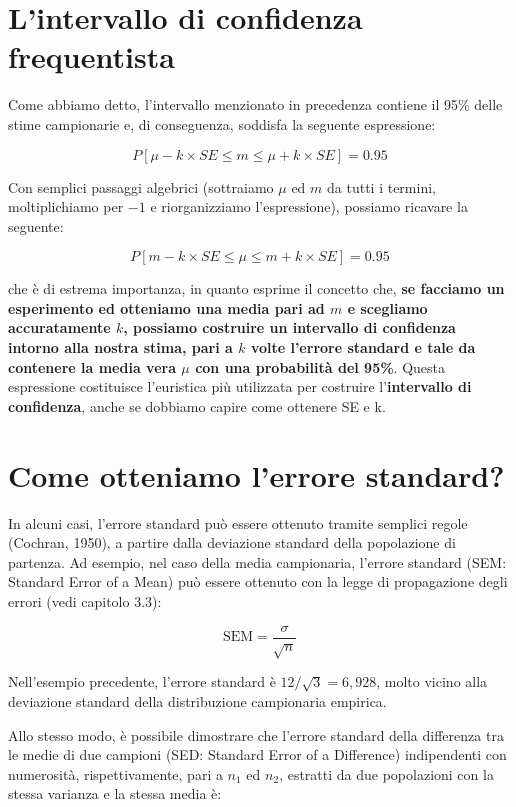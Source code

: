 \documentclass[
  12pt,
]{book}
\begin{document}
\hypertarget{lintervallo-di-confidenza-frequentista}{%
\section{L'intervallo di confidenza frequentista}\label{lintervallo-di-confidenza-frequentista}}

Come abbiamo detto, l'intervallo menzionato in precedenza contiene il 95\% delle stime campionarie e, di conseguenza, soddisfa la seguente espressione:

\[P \left[ \mu - k \times SE  \leq m \leq \mu + k \times SE \right] = 0.95\]

Con semplici passaggi algebrici (sottraiamo \(\mu\) ed \(m\) da tutti i termini, moltiplichiamo per \(-1\) e riorganizziamo l'espressione), possiamo ricavare la seguente:

\[P \left[ m - k \times SE \leq \mu \leq m + k \times SE \right] = 0.95\]

che è di estrema importanza, in quanto esprime il concetto che, \textbf{se facciamo un esperimento ed otteniamo una media pari ad \(m\) e scegliamo accuratamente \(k\), possiamo costruire un intervallo di confidenza intorno alla nostra stima, pari a \(k\) volte l'errore standard e tale da contenere la media vera \(\mu\) con una probabilità del 95\%}. Questa espressione costituisce l'euristica più utilizzata per costruire l'\textbf{intervallo di confidenza}, anche se dobbiamo capire come ottenere SE e k.

\hypertarget{come-otteniamo-lerrore-standard}{%
\section{Come otteniamo l'errore standard?}\label{come-otteniamo-lerrore-standard}}

In alcuni casi, l'errore standard può essere ottenuto tramite semplici regole (Cochran, 1950), a partire dalla deviazione standard della popolazione di partenza. Ad esempio, nel caso della media campionaria, l'errore standard (SEM: Standard Error of a Mean) può essere ottenuto con la legge di propagazione degli errori (vedi capitolo 3.3):

\[\textrm{SEM}  = \frac{\sigma}{\sqrt n}\]

Nell'esempio precedente, l'errore standard è \(12/\sqrt{3} = 6,928\), molto vicino alla deviazione standard della distribuzione campionaria empirica.

Allo stesso modo, è possibile dimostrare che l'errore standard della differenza tra le medie di due campioni (SED: Standard Error of a Difference) indipendenti con numerosità, rispettivamente, pari a \(n_1\) ed \(n_2\), estratti da due popolazioni con la stessa varianza e la stessa media è:
\end{document}

